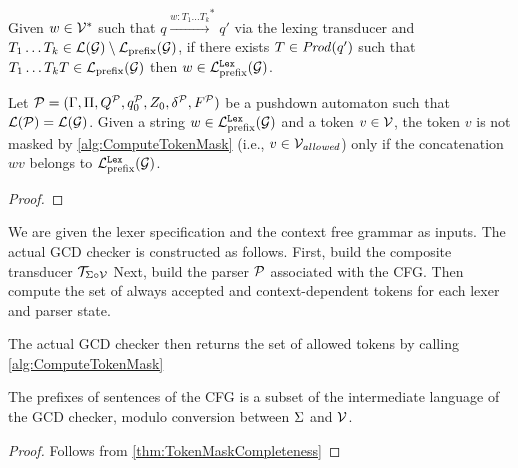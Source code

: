 \begin{lemma}
    \label{lem:soundness-lemma}
    Given $w \in \mathcal{V}^\ast$ such that $q \xrightarrow{w: T_1 \ldots T_k}^\ast q'$ via the lexing transducer and $T_1 \ldots T_k \in \mathcal{L}(\mathcal{G}) \setminus \mathcal{L}_{\mathrm{prefix}}(\mathcal{G})$,
    if there exists $T \in \mathit{Prod}(q')$ such that $T_1 \ldots T_k T \in \mathcal{L}_{\mathrm{prefix}}(\mathcal{G})$ then $w \in \mathcal{L}_{\mathrm{prefix}}^{\mathtt{Lex}}(\mathcal{G})$.

\end{lemma}

\begin{theorem}
    \label{thm:TokenMaskSoundness}
    Let $\mathcal{P} = (\Gamma, \Pi, Q^{\mathcal{P}}, q_0^{\mathcal{P}}, Z_0, \delta^{\mathcal{P}}, F^{\mathcal{P}})$ be a pushdown automaton such that $\mathcal{L}(\mathcal{P}) = \mathcal{L}(\mathcal{G})$.
    Given a string $w \in \mathcal{L}_{\mathrm{prefix}}^{\mathtt{Lex}}(\mathcal{G})$ and a token $v \in \mathcal{V}$, the token $v$ is not masked by \autoref{alg:ComputeTokenMask}  (i.e., $v \in \mathcal{V}_{\textit{allowed}}$) only if the concatenation $wv$ belongs to $\mathcal{L}_{\mathrm{prefix}}^{\mathtt{Lex}}(\mathcal{G})$.
\end{theorem}
\begin{proof}
\end{proof}

\begin{definition}[GCDChecker]
    \label{def:GCDChecker}
    We are given the lexer specification and the context free grammar as inputs.
    The actual GCD checker is constructed as follows. 
    First, build the composite transducer $\mathcal{T}_{\Sigma \circ \mathcal{V}}$
    Next, build the parser $\mathcal{P}$ associated with the CFG. Then compute the set of always accepted and context-dependent tokens for each lexer and parser state.

    The actual GCD checker then returns the set of allowed tokens by calling \ref{alg:ComputeTokenMask}
\end{definition}

\begin{theorem}
    \label{thm:PrefixSubsetIntermediate} 
    The prefixes of sentences of the CFG is a subset of the intermediate language of the GCD checker, modulo conversion between $\Sigma$ and $\mathcal{V}$.
\end{theorem}
\begin{proof}
    Follows from \ref{thm:TokenMaskCompleteness}
\end{proof}


